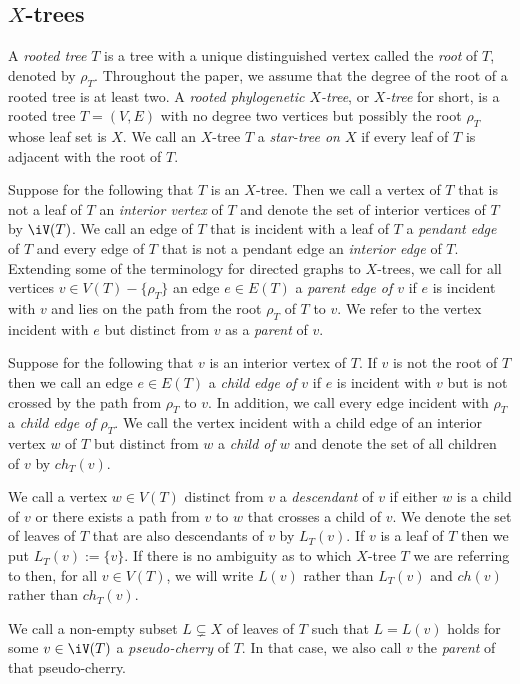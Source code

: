 \subsection{$X$-trees}
A {\em rooted tree} $T$ is a tree with a unique distinguished vertex called
the {\em root} of $T$, denoted by $\rho_T$. Throughout the paper, we assume
that the degree of the root of a rooted tree is at least two.  A {\em rooted
  phylogenetic $X$-tree}, or {\em $X$-tree} for short, is a rooted tree
$T=(V,E)$ with no degree two vertices but possibly the root $\rho_T$ whose
leaf set is $X$. We call an $X$-tree $T$ a {\em star-tree on $X$} if every
leaf of $T$ is adjacent with the root of $T$.

Suppose for the following that $T$ is an $X$-tree. Then we call a vertex of
$T$ that is not a leaf of $T$ an {\em interior vertex} of $T$ and denote the
set of interior vertices of $T$ by $\iV(T)$.  We call an edge of $T$ that is
incident with a leaf of $T$ a {\em pendant edge} of $T$ and every edge of $T$
that is not a pendant edge an {\em interior edge} of $T$.  Extending some of
the terminology for directed graphs to $X$-trees, we call for all vertices
$v\in V(T)-\{\rho_T\}$ an edge $e\in E(T)$ a {\em parent edge of $v$} if $e$
is incident with $v$ and lies on the path from the root $\rho_T$ of $T$ to
$v$. We refer to the vertex incident with $e$ but distinct from $v$ as a {\em
  parent} of $v$.
 
Suppose for the following that $v$ is an interior vertex of $T$. If $v$ is not
the root of $T$ then we call an edge $e\in E(T)$ a {\em child edge of $v$} if
$e$ is incident with $v$ but is not crossed by the path from $\rho_T$ to $v$.
In addition, we call every edge incident with $\rho_T$ a {\em child edge of
  $\rho_T$}.  We call the vertex incident with a child edge of an interior
vertex $w$ of $T$ but distinct from $w$ a {\em child of $w$} and denote the
set of all children of $v$ by $ch_T(v)$.

We call a vertex $w\in V(T)$ distinct from $v$ a {\em descendant} of $v$ if
either $w$ is a child of $v$ or there exists a path from $v$ to $w$ that
crosses a child of $v$.  We denote the set of leaves of $T$ that are also
descendants of $v$ by $L_T(v)$. If $v$ is a leaf of $T$ then we put
$L_T(v):=\{v\}$. If there is no ambiguity as to which $X$-tree $T$ we are
referring to then, for all $v\in V(T)$, we will write $L(v)$ rather than
$L_T(v)$ and $ch(v)$ rather than $ch_T(v)$.

We call a non-empty subset $L\subsetneq X$ of leaves of $T$ such that $L=L(v)$
holds for some $v\in \iV(T)$ a {\em pseudo-cherry} of $T$. In that case, we
also call $v$ the {\em parent} of that pseudo-cherry.

